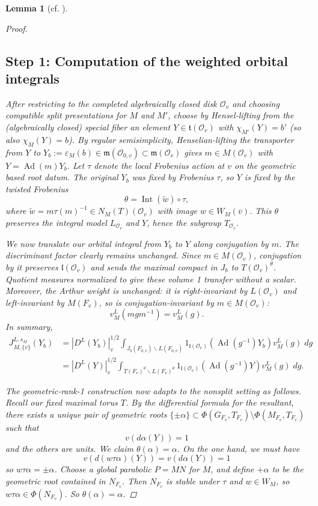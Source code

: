 \documentclass[openany]{amsbook}
\newtheorem{lemma}[theorem]{Lemma}
\theoremstyle{definition}
\theoremstyle{remark}
\numberwithin{equation}{section}
\renewcommand{\O}{\mathcal{O}}
\newcommand{\ol}[1]{\overline{#1}}
\renewcommand{\epsilon}{\varepsilon}
\renewcommand{\-}{\operatorname{-}}
\newcommand{\on}[1]{\operatorname{#1}}
\newcommand{\wtilde}[1]{\widetilde{#1}}
\newcommand{\fm}{\mathfrak{m}}
\newcommand{\ft}{\mathfrak{t}}
\newcommand{\fl}{\mathfrak{l}}
\renewcommand{\fm}{\mathfrak{m}}
\newcommand{\Ad}{\on{Ad}}
\begin{document}
\begin{lemma}[{cf. \cite[Lemme 17.6.2, Lemme 17.8.1]{CLII}}]
\begin{proof}
        \subsection{Step 1: Computation of the weighted orbital integrals}         After restricting to the completed algebraically closed disk $\O_v$ and choosing compatible split presentations for $M$ and $M'$, choose by Hensel-lifting from the (algebraically closed) special fiber an element $Y \in \ft(\O_v)$  with $\chi_{M'}(Y) = b'$ (so also $\chi_M(Y) = b$). By regular semisimplicity, Henselian-lifting the transporter from $Y$ to $Y_b := \epsilon_M(b) \in \fm(\O_{0,v}) \subset \fm(\O_v)$ gives $m \in M(\O_v)$ with $Y = \Ad(m) Y_b$. Let $\tau$ denote the local Frobenius action at $v$ on the geometric based root datum. The original $Y_b$ was fixed by Frobenius $\tau$, so $Y$ is fixed by the twisted Frobenius
        $$
            \theta = \on{Int}(\wtilde{w}) \circ \tau,
        $$
        where $\wtilde{w} = m \tau(m)^{-1} \in N_M(T)(\O_v)$ with image $w \in W_M(\ol{v})$. This $\theta$ preserves the integral model $L_{\O_v}$ and $Y$, hence the subgroup $T_{\O_v}$. 
        
        We now translate our orbital integral from $Y_b$ to $Y$ along conjugation by $m$. The discriminant factor clearly remains unchanged. Since $m \in M(\O_v)$, conjugation by it preserves $\fl(\O_v)$ and sends the maximal compact in $J_b$ to $T(\O_v)^{\theta}$. Quotient measures normalized to give these volume 1 transfer without a scalar. Moreover, the Arthur weight is unchanged: it is right-invariant by $L(\O_v)$ and left-invariant by $M(F_v)$, so is conjugation-invariant by $m \in M(\O_v)$:
        $$
            v_M^L(m g m^{-1}) = v_M^L(g).
        $$
        In summary,
        \begin{align*}
            J_{M,\{v\}}^{L, s_M}(Y_b) &= |D^L(Y_b)|_v^{1/2} \int_{J_b(F_{0,v}) \backslash L(F_{0,v})} 1_{\fl(\O_v)}(\Ad(g^{-1}) Y_b) v_M^L(g) \; dg \\
            &= |D^L(Y)|_v^{1/2} \int_{T(F_v)^{\theta} \backslash L(F_{v})^{\theta}} 1_{\fl(\O_v)}(\Ad(g^{-1}) Y) v_M^L(g) \; dg.
        \end{align*}

        The geometric-rank-1 construction now adapts to the nonsplit setting as follows. Recall our fixed maximal torus $T$. By the differential formula for the resultant, there exists a \emph{unique} pair of geometric roots $\{\pm \alpha\} \subset \Phi(G_{F_v},T_{F_v}) \setminus \Phi(M_{F_v},T_{F_v})$ such that 
        $$
            v(d\alpha(Y)) = 1
        $$
        and the others are units. We claim $\theta(\alpha) = \alpha$. On the one hand, we must have 
        $$
            v(d(w\tau \alpha)(Y)) = v(d\alpha(Y)) = 1
        $$
        so $w\tau \alpha = \pm \alpha$. Choose a global parabolic $P = MN$ for $M$, and define $+\alpha$ to be the geometric root contained in $N_{F_v}$. Then $N_{F_v}$ is stable under $\tau$ and $w \in W_M$, so $w\tau \alpha \in \Phi(N_{F_v})$. So $\theta(\alpha) = \alpha$. 
        

\end{proof}
\end{lemma}
\end{document}
